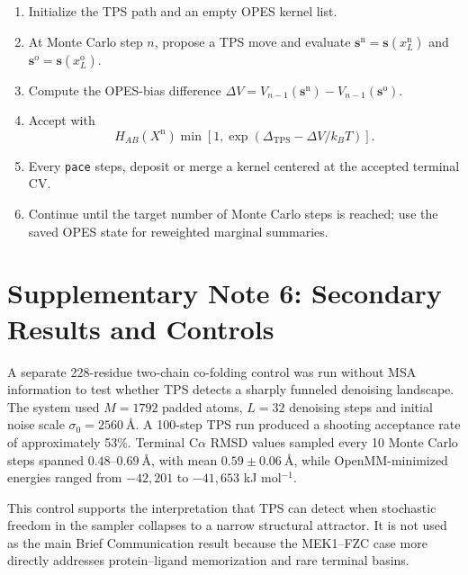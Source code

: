 \documentclass[11pt,a4paper]{article}
\newcommand{\HAB}{H_{AB}}
\newcommand{\Xnew}{X^{\mathrm{n}}}
\begin{document}
\begin{enumerate}[leftmargin=*]
  \item Initialize the TPS path and an empty OPES kernel list.
  \item At Monte Carlo step $n$, propose a TPS move and evaluate
  $\mathbf{s}^{\mathrm{n}}=\mathbf{s}(x_L^{\mathrm{n}})$ and
  $\mathbf{s}^{\mathrm{o}}=\mathbf{s}(x_L^{\mathrm{o}})$.
  \item Compute the OPES-bias difference
  $\Delta V=V_{n-1}(\mathbf{s}^{\mathrm{n}})-V_{n-1}(\mathbf{s}^{\mathrm{o}})$.
  \item Accept with
  \[
    \HAB(\Xnew)\min\left[1,
    \exp(\Delta_{\mathrm{TPS}}-\Delta V/k_BT)\right].
  \]
  \item Every \texttt{pace} steps, deposit or merge a kernel centered at the
  accepted terminal CV.
  \item Continue until the target number of Monte Carlo steps is reached; use
  the saved OPES state for reweighted marginal summaries.
\end{enumerate}

\section{Supplementary Note 6: Secondary Results and Controls}
\label{sec:secondary}

A separate 228-residue two-chain co-folding control was run without MSA
information to test whether TPS detects a sharply funneled denoising
landscape. The system used $M=1792$ padded atoms, $L=32$ denoising steps and
initial noise scale $\sigma_0=2560~\text{\AA}$. A 100-step TPS run produced a
shooting acceptance rate of approximately 53\%. Terminal C$\alpha$ RMSD values
sampled every 10 Monte Carlo steps spanned $0.48$--$0.69~\text{\AA}$, with
mean $0.59\pm0.06~\text{\AA}$, while OpenMM-minimized energies ranged from
$-42{,}201$ to $-41{,}653$ kJ mol$^{-1}$.

This control supports the interpretation that TPS can detect when stochastic
freedom in the sampler collapses to a narrow structural attractor. It is not
used as the main Brief Communication result because the MEK1--FZC case more
directly addresses protein--ligand memorization and rare terminal basins.
\end{document}
